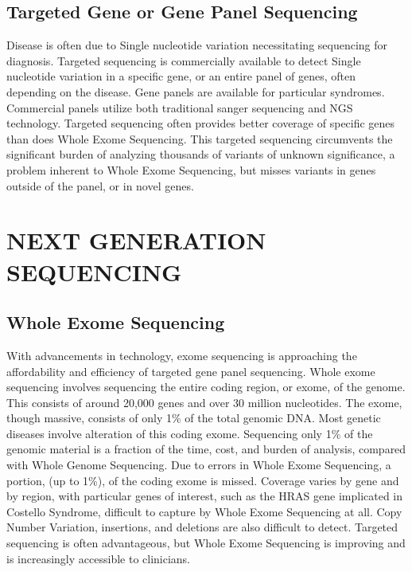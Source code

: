\documentclass[sigconf]{acmart}
\begin{document}
\subsection{Targeted Gene or Gene Panel Sequencing}
Disease is often due to Single nucleotide variation necessitating sequencing for diagnosis.  Targeted sequencing is commercially available to detect Single nucleotide variation in a specific gene, or an entire panel of  genes, often depending on the disease.  Gene panels are available for particular syndromes. Commercial panels utilize both traditional sanger sequencing and NGS technology.  Targeted sequencing often provides better coverage of specific genes than does Whole Exome Sequencing. This targeted sequencing circumvents the significant burden of analyzing thousands of variants of unknown significance, a problem inherent to Whole Exome Sequencing, but misses variants in genes outside of the panel, or in novel genes.

\section{NEXT GENERATION SEQUENCING}

\subsection{Whole Exome Sequencing}
With advancements in technology, exome sequencing is approaching the affordability and efficiency of targeted gene panel sequencing.  Whole exome sequencing involves sequencing the entire coding region, or exome, of the genome.  This consists of around 20,000 genes and over 30 million nucleotides.  The exome, though massive, consists of only 1\% of the total genomic DNA.  Most genetic diseases involve alteration of this coding exome.  Sequencing only 1\% of the genomic material is a fraction of the time, cost, and burden of analysis, compared with Whole Genome Sequencing. Due to errors in Whole Exome Sequencing, a portion, (up to 1\%), of the coding exome is missed.   Coverage varies by gene and by region, with particular genes of interest, such as the HRAS gene implicated in Costello Syndrome, difficult to capture by Whole Exome Sequencing at all. Copy Number Variation, insertions, and deletions are also difficult to detect. Targeted sequencing is often advantageous, but Whole Exome Sequencing is improving and is increasingly accessible to clinicians. \cite{yang2013clinical} 
\end{document}
